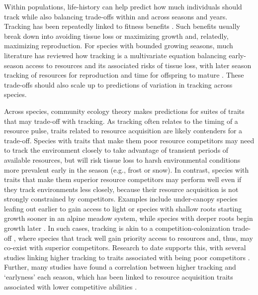 \documentclass[11pt,letterpaper]{article}
\begin{document}
Within populations, life-history can help predict how much individuals should track while also balancing trade-offs within and across seasons and years. Tracking has been repeatedly linked to fitness benefits \citep[e.g.,][]{farzan2018,deacy2018}. Such benefits usually break down into avoiding tissue loss or maximizing growth and, relatedly, maximizing reproduction. For species with bounded growing seasons, much literature has reviewed how tracking is a multivariate equation balancing early-season access to resources and its associated risks of tissue loss, with later season tracking of resources for reproduction and time for offspring to mature \citep{donohue2002,Morin:2005ye,Burghardt2015}. These trade-offs should also scale up to predictions of variation in tracking across species. %

Across species, community ecology theory makes predictions for suites of traits that may trade-off with tracking. As tracking often relates to the timing of a resource pulse, traits related to resource acquisition are likely contenders for a trade-off. Species with traits that make them poor resource competitors may need to track the environment closely to take advantage of transient periods of available resources, but will risk tissue loss to harsh environmental conditions more prevalent early in the season (e.g., frost or snow). In contrast, species with traits that make them superior resource competitors may perform well even if they track environments less closely, because their resource acquisition is not strongly constrained by competitors. Examples include under-canopy species leafing out earlier to gain access to light \citep{heberling2019} or species with shallow roots starting growth sooner in an alpine meadow system, while species with deeper roots begin growth later \citep{Zhu2016BioLetters}. In such cases, tracking is akin to a competition-colonization trade-off \citep{Amarasekare:2003tq}, where species that track well gain priority access to resources and, thus, may co-exist with superior competitors. Research to date supports this, with several studies linking higher tracking to traits associated with being poor competitors \citep{Dorji2013,lasky2016,Zhu2016BioLetters}. Further, many studies have found a correlation between higher tracking and `earlyness' each season, which has been linked to resource acquisition traits associated with lower competitive abilities \citep[][see Box `Trait trade-offs with tracking']{wolkovich2014aob}. 
\end{document}
